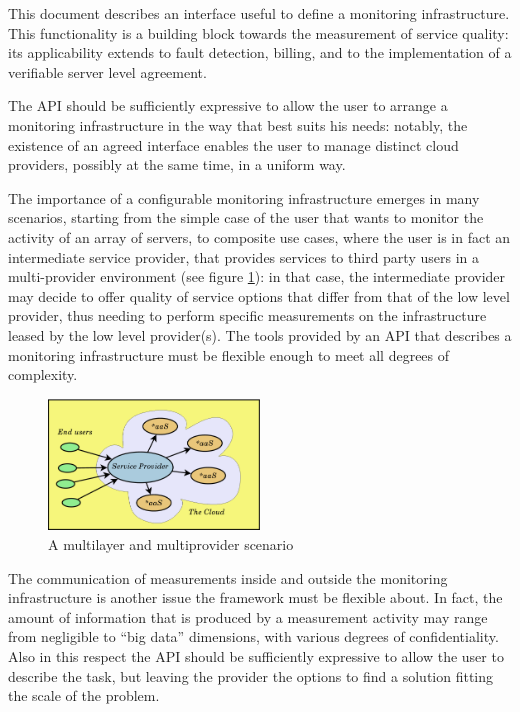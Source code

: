 \documentclass[10pt,a4paper]{article}
\begin{document}
This document describes an interface useful to define a monitoring infrastructure. This functionality is a building block towards the measurement of service quality: its applicability extends to fault detection, billing, and to the implementation of a verifiable server level agreement.

The API should be sufficiently expressive to allow the user to arrange a monitoring infrastructure in the way that best suits his needs: notably, the existence of an agreed interface enables the user to manage distinct cloud providers, possibly at the same time, in a uniform way.

The importance of a configurable monitoring infrastructure emerges in many scenarios, starting from the simple case of the user that wants to monitor the activity of an array of servers, to composite use cases, where the user is in fact an intermediate service provider, that provides services to third party users in a multi-provider environment (see figure \ref{img:scenario}): in that case, the intermediate provider may decide to offer quality of service options that differ from that of the low level provider, thus needing to perform specific measurements on the infrastructure leased by the low level provider(s). The tools provided by an API that describes a monitoring infrastructure must be flexible enough to meet all degrees of complexity.

\begin{figure}[b]
\centering
\includegraphics[width=0.5\textwidth]{figs/multilayer.pdf}
\caption{A multilayer and multiprovider scenario \label{img:scenario}}
\end{figure}

The communication of measurements inside and outside the monitoring infrastructure is another issue the framework must be flexible about. In fact, the amount of information that is produced by a measurement activity may range from negligible to ``big data'' dimensions, with various degrees of confidentiality. Also in this respect the API should be sufficiently expressive to allow the user to describe the task, but leaving the provider the options to find a solution fitting the scale of the problem.
\end{document}
